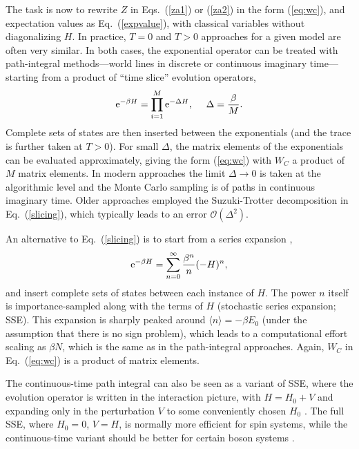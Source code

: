\documentclass[range]{ar2e}
\begin{document}
The task is now to rewrite $Z$ in Eqs.~(\ref{za1}) or (\ref{za2}) in the form (\ref{eq:wc}), and expectation values as Eq.~(\ref{expvalue}), with classical variables 
without diagonalizing $H$. In practice, $T=0$ and $T>0$ approaches for a given model are often very similar. In both cases, the exponential 
operator can be treated with path-integral methods---world lines in discrete \cite{Suzuki77,Hirsch82} or continuous \cite{Beard96,Prokofev96,Prokofev98} 
imaginary time---starting from a product of ``time slice'' evolution operators,
\begin{equation}
{\rm e}^{-\beta H}= \prod_{i=1}^M {\rm e}^{-\Delta H},~~~~ \Delta=\frac{\beta}{M}.
\label{slicing}
\end{equation}
Complete sets of states are then inserted between the exponentials (and the trace is further taken at $T>0$). For small $\Delta$, the
matrix elements of the exponentials can be evaluated approximately, giving the form (\ref{eq:wc}) with $W_C$ a product of $M$ matrix elements. 
In modern approaches the limit $\Delta \to 0$ is taken at the algorithmic level \cite{Prokofev96,WormA,Beard96} and the Monte Carlo sampling is of 
paths in continuous imaginary time. Older approaches employed the Suzuki-Trotter decomposition \cite{Suzuki76} in Eq.~(\ref{slicing}), which 
typically leads to an error $\mathcal{O}(\Delta^2)$.

An alternative to Eq.~(\ref{slicing}) is to start from a series expansion \cite{Handscomb62,Sandvik91},
\begin{equation}
{\rm e}^{-\beta H}= \sum_{n=0}^\infty \frac{\beta^n}{n}(-H)^n,
\label{series}
\end{equation}
and insert complete sets of states between each instance of $H$. The power $n$ itself is importance-sampled along with the terms of $H$ 
(stochastic series expansion; SSE). This expansion is sharply peaked around $\langle n\rangle = -\beta E_0$ (under the assumption that there 
is no sign problem), which leads to a computational effort scaling as $\beta N$, which is the same as in the path-integral approaches. Again, $W_C$ 
in Eq.~(\ref{eq:wc}) is a product of matrix elements. 

The continuous-time path integral can also be seen as a variant of SSE, where the evolution operator is written in the interaction picture, 
with $H=H_0+V$ and expanding only in the perturbation $V$ to some conveniently chosen $H_0$ \cite{Prokofev96,Sandvik97a}. The full SSE, where $H_0=0$, $V=H$, 
is normally more efficient for spin systems, while the continuous-time variant should be better for certain boson systems \cite{Troyer03}.
\end{document}
